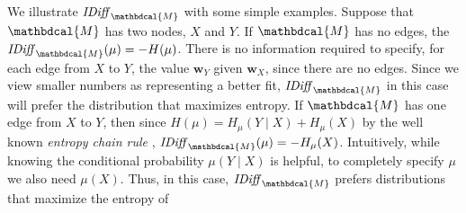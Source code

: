 \documentclass{article}
\theoremstyle{plain}
\theoremstyle{definition}
\theoremstyle{remark}
\newcommand\mat[1]{\mathbf{#1}}
\newcommand{\commentout}[1]{\ignorespaces}
\newcommand{\dg}[1]{\mathbdcal{#1}}
\newcommand{\IBal}[1]{\mathit{IDiff}_{#1}}
\numberwithin{equation}{section}
\begin{document}
We illustrate $\IBal{\dg M}$ with some simple examples.  
%
\commentout{
	
This appraoch combines the benefits of choosing
the maximum-entropy distribution consistent with
constraints \cite{Jaynes57}, while also providing the ability to back off of this (e.g., by providing a universal graph structure), and simultaneously providing a way of articulating qualitative independences.
There is no information required
}
Suppose that $\dg M$ has two nodes, $X$ and $Y$.  
If $\dg M$ has no edges, the $\IBal{\dg M}(\mu) = - H(\mu)$.
There is no information required to specify, for each edge from $X$ to
$Y$, the value ${\mat w}_Y$ given ${\mat w}_X$, since there are no
edges.
Since we view smaller numbers as representing a better fit,
$\IBal{\dg M}$ in this case will prefer the distribution that
maximizes entropy.
If $\dg M$ has one edge from $X$ to $Y$, then since
$H(\mu) = H_{\mu}(Y \mid X) + H_\mu(X)$ by the well known 
\emph{entropy chain rule} \cite{mackay2003information},
$\IBal{\dg   M}(\mu) = -H_{\mu}(X)$.
Intuitively, while knowing the conditional probability $\mu(Y \mid X)$
is helpful, to completely specify $\mu$ we also need 
$\mu(X)$.     Thus, in this case, $\IBal{\dg
  M}$ prefers distributions that maximize the entropy of 
\end{document}
